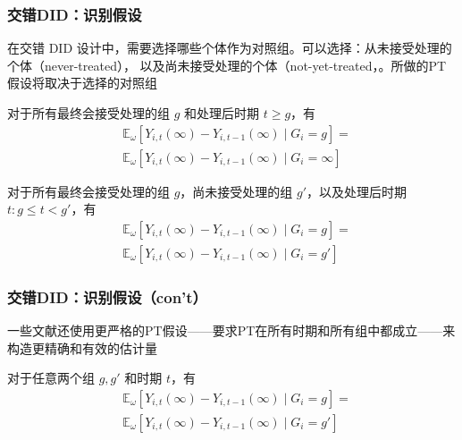 \documentclass[../didNotes.tex]{subfiles}
\begin{document}
\begin{frame}
  \frametitle{交错DID：识别假设}

  在交错 DID 设计中，需要选择哪些个体作为对照组。可以选择：从未接受处理的个体（never-treated），
  以及尚未接受处理的个体（not-yet-treated，。所做的PT假设将取决于选择的对照组

  \begin{assumption}\label{thm:pt-nev}
    对于所有最终会接受处理的组 \( g \) 和处理后时期 \( t \ge g \)，有
    \begin{align*}
      &\mathbb{E}_{\omega}[Y_{i,t}(\infty)-Y_{i,t-1}(\infty) \mid G_i=g] = \\
      &\mathbb{E}_{\omega}[Y_{i,t}(\infty)-Y_{i,t-1}(\infty) \mid G_i=\infty]
    \end{align*}
  \end{assumption}

  \begin{assumption}\label{thm:pt-not-yet}
    对于所有最终会接受处理的组 \( g \)，尚未接受处理的组 \( g' \)，以及处理后时期
    \( t: g \le t < g' \)，有
    \begin{align*}
      &\mathbb{E}_{\omega}[Y_{i,t}(\infty)-Y_{i,t-1}(\infty) \mid G_i=g] = \\
      &\mathbb{E}_{\omega}[Y_{i,t}(\infty)-Y_{i,t-1}(\infty) \mid G_i=g']
    \end{align*}
  \end{assumption}

\end{frame}

\begin{frame}
  \frametitle{交错DID：识别假设（con't）}

  一些文献还使用更严格的PT假设——要求PT在所有时期和所有组中都成立——来构造更精确和有效的估计量
  \begin{assumption}\label{thm:pt-all}
    对于任意两个组 \( g,g' \) 和时期 \( t \)，有
    \begin{align*}
      &\mathbb{E}_{\omega}[Y_{i,t}(\infty)-Y_{i,t-1}(\infty) \mid G_i=g] = \\
      &\mathbb{E}_{\omega}[Y_{i,t}(\infty)-Y_{i,t-1}(\infty) \mid G_i=g']
    \end{align*}
  \end{assumption}

\end{frame}
\end{document}
